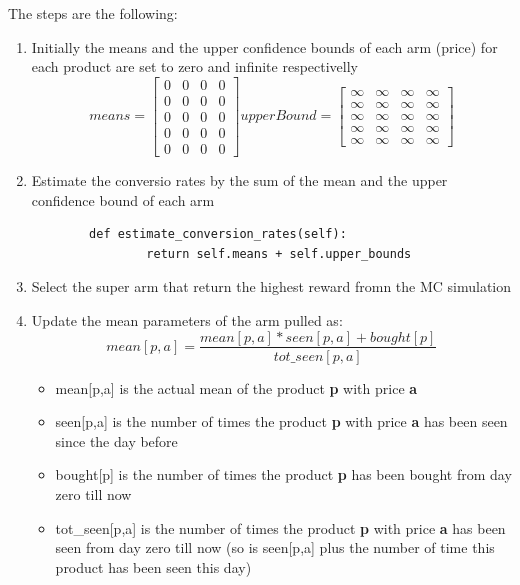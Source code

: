 The steps are the following:
\begin{enumerate}
    \item Initially the means and the upper confidence bounds of each arm (price) for each product are set to zero and infinite respectivelly \[ means=
    \begin{bmatrix}
            0 & 0 & 0 & 0\\
            0 & 0 & 0 & 0\\
            0 & 0 & 0 & 0\\
            0 & 0 & 0 & 0\\
            0 & 0 & 0 & 0
    \end{bmatrix}upperBound=
    \begin{bmatrix}
            \infty & \infty & \infty & \infty\\
            \infty & \infty & \infty & \infty\\
            \infty & \infty & \infty & \infty\\
            \infty & \infty & \infty & \infty\\
            \infty & \infty & \infty & \infty
    \end{bmatrix}
    \]
    \item Estimate the conversio rates by the sum of the mean and the upper confidence bound of each arm\begin{verbatim}
        def estimate_conversion_rates(self):
                return self.means + self.upper_bounds
        \end{verbatim}
    \item Select the super arm that return the highest reward fromn the MC simulation
    \item Update the mean parameters of the arm pulled as:\begin{equation}
            mean[p,a] = \frac{mean[p,a] * seen[p,a] + bought[p]}{tot\_seen[p,a]}
        \end{equation}
        \begin{itemize}
            \item mean[p,a] is the actual mean of the product {\bf p} with price {\bf a}
            \item seen[p,a] is the number of times the product {\bf p} with price {\bf a} has been seen since the day before
            \item bought[p] is the number of times the product {\bf p} has been bought from day zero till now
            \item tot\_seen[p,a] is the number of times the product {\bf p} with price {\bf a} has been seen from day zero till now (so is seen[p,a] plus the number of time this product has been seen this day)

\end{itemize}
\end{enumerate}
